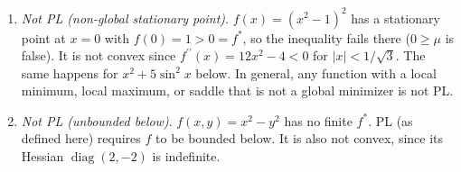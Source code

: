 \begin{example}
\begin{enumerate}
			\item \textit{Not PL (non-global stationary point)}. $f(x) = (x^2 - 1)^2$ has a stationary point at $x = 0$ with $f(0) = 1 > 0 = f^\ast$, so the inequality fails there ($0 \geq \mu$ is false). It is not convex since $f^{\prime\prime}(x) = 12x^2 - 4 < 0$ for $|x| < 1/\sqrt{3}$. The same happens for $x^2 + 5\sin^2 x$ below. In general, any function with a local minimum, local maximum, or saddle that is not a global minimizer is not PL. 
			\item \textit{Not PL (unbounded below)}. $f(x, y) = x^2 - y^2$ has no finite $f^\ast$. PL (as defined here) requires $f$ to be bounded below. It is also not convex, since its Hessian $\operatorname{diag}(2, -2)$ is indefinite. 
		\end{enumerate}
	\end{example}

